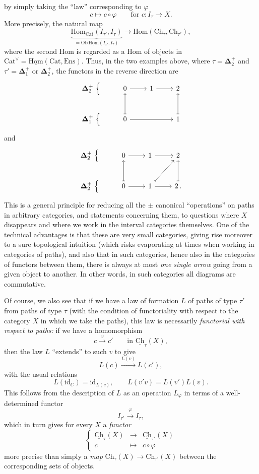 \documentclass[11pt]{article}
\newcommand{\printedpage}[1]{\marginpar{\footnotesize p.~#1}}
\newcommand{\msp}[1]{\marginpar{\footnotesize [#1]}}
\newcommand{\Hom}{\mathrm{Hom}}
\newcommand{\uHom}{\underline{\mathrm{Hom}}}
\newcommand{\uCh}{\underline{\mathrm{Ch}}}
\newcommand{\Cat}{\mathrm{Cat}}
\newcommand{\bDelta}{\boldsymbol{\Delta}}
\begin{document}
\printedpage{14}

by simply taking the ``law'' corresponding to $\varphi$
\[
c \longmapsto c\circ\varphi \qquad \text{for } c : I_\tau \longrightarrow X.
\]
More precisely, the natural map
\[
\underbrace{\Hom_{\Cat}(I_{\tau'},I_\tau)}_{=\mathrm{Ob}\,\uHom(I_{\tau'},I_\tau)} \longrightarrow \Hom(\mathrm{Ch}_\tau,\mathrm{Ch}_{\tau'}),
\]
\msp{page 22}
where the second Hom is regarded as a Hom of objects in $\Cat^{\vee}=\uHom(\Cat,\mathrm{Ens})$. Thus, in the two examples above, where $\tau=\bDelta_2^+$ and $\tau'=\bDelta_1^+$ or $\bDelta_2^+$, the functors in the reverse direction are
\[
\begin{tikzcd}
\bDelta_2^+\ \Big\{ & 0 \arrow[r] & 1 \arrow[r] & 2 \\
\bDelta_1^+\ \Big\{ & 0 \arrow[u, mapsto] \arrow[rr] & & 1 \arrow[u, mapsto]
\end{tikzcd}
\]
and
\[
\begin{tikzcd}
\bDelta_2^+\ \Big\{ & 0 \arrow[r] & 1 \arrow[r] & 2 \\
\bDelta_2^+\ \Big\{ & 0 \arrow[u, mapsto] \arrow[r] & 1 \arrow[ur, mapsto] \arrow[r] & 2\,. \arrow[u, mapsto]
\end{tikzcd}
\]
This is a general principle for reducing all the $\pm$ canonical ``operations'' on paths in arbitrary categories, and statements concerning them, to questions where $X$ disappears and where we work in the interval categories themselves. One of the technical advantages is that these are very small categories, giving rise moreover to a sure topological intuition (which risks evaporating at times when working in categories of paths), and also that in such categories, hence also in the categories of functors between them, there is always at most
\msp{page 23}
\textit{one single arrow} going from a given object to another. In other words, in such categories all diagrams are commutative.

Of course, we also see that if we have a law of formation $L$ of paths of type $\tau'$ from paths of type $\tau$ (with the condition of functoriality with respect to the category $X$ in which we take the paths), this law is necessarily \textit{functorial with respect to paths:} if we have a homomorphism
\[
c \xrightarrow{v} c' \qquad \text{in } \uCh_\tau(X),
\]
\printedpage{15}
then the law $L$ ``extends'' to such $v$ to give
\[
L(c) \xrightarrow{L(v)} L(c'),
\]
with the usual relations
\[
L(\mathrm{id}_C)=\mathrm{id}_{L(c)}, \qquad L(v'v)=L(v')L(v). %
\]
This follows from the description of $L$ as an operation $L_\varphi$ in terms of a well-determined functor
\[
I_{\tau'} \xrightarrow{\varphi} I_\tau,
\]
which in turn gives for every $X$ a \textit{functor}
\[
\left\{
\begin{array}{rcl}
\uCh_\tau(X) & \longrightarrow & \uCh_{\tau'}(X)\\[1ex]
c & \longmapsto & c\circ\varphi
\end{array}
\right.
\]
more precise than simply a \textit{map} $\mathrm{Ch}_\tau(X)\longrightarrow\mathrm{Ch}_{\tau'}(X)$ between the corresponding sets of objects. %
\end{document}
